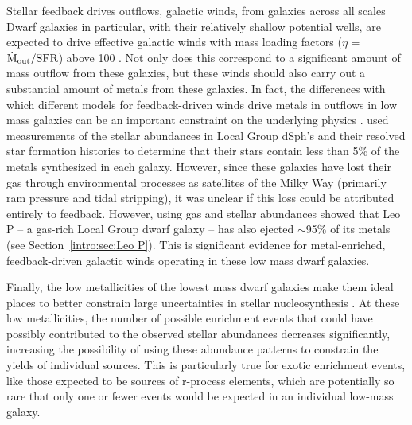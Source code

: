Stellar feedback drives outflows, galactic winds, from galaxies across all scales
Dwarf galaxies in particular, with their relatively shallow potential wells, are expected to drive effective galactic winds \citep{MacLowFerrara1999} with mass loading factors ($\eta$ = $\dot{\rm{M}}_{\rm out} / {\rm SFR}$) above 100 \citep{Muratov2015,Christensen2018}. Not only does this correspond to a significant amount of mass outflow from these galaxies, but these winds should also carry out a substantial amount of metals from these galaxies. In fact, the differences with which different models for feedback-driven winds drive metals in outflows in low mass galaxies can be an important constraint on the underlying physics \citep[e.g.][]{Wheeler2018,Agertz2019}. \cite{Kirby2011-metals} used measurements of the stellar abundances in Local Group dSph's and their resolved star formation histories to determine that their stars contain less than 5\% of the metals synthesized in each galaxy. However, since these galaxies have lost their gas through environmental processes as satellites of the Milky Way (primarily ram pressure and tidal stripping), it was unclear if this loss could be attributed entirely to feedback. However, using gas and stellar abundances \cite{McQuinn2015} showed that Leo P -- a gas-rich Local Group dwarf galaxy -- has also ejected $\sim$95\% of its metals (see Section~\ref{intro:sec:Leo P}). This is significant evidence for metal-enriched, feedback-driven galactic winds operating in these low mass dwarf galaxies.

Finally, the low metallicities of the lowest mass dwarf galaxies make them ideal places to better constrain large uncertainties in stellar nucleosynthesis \citep{FrebelNorris2015,Frebel2018}. At these low metallicities, the number of possible enrichment events that could have possibly contributed to the observed stellar abundances decreases significantly, increasing the possibility of using these abundance patterns to constrain the yields of individual sources. This is particularly true for exotic enrichment events, like those expected to be sources of r-process elements, which are potentially so rare that only one or fewer events would be expected in an individual low-mass galaxy.

